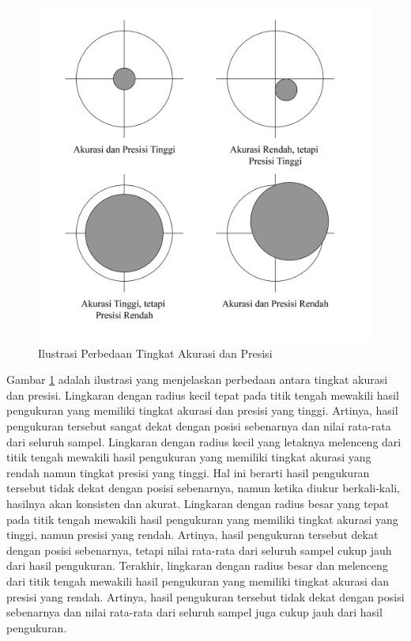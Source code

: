 \begin{figure}[H]
	\centering
	\includegraphics[width=12cm]{contents/chapter-2/acc.png}
	\caption{Ilustrasi Perbedaan Tingkat Akurasi dan Presisi}
	\label{Fig: acc-and-prec-diff}
\end{figure}

\newpage
Gambar \ref{Fig: acc-and-prec-diff} adalah ilustrasi yang menjelaskan perbedaan antara tingkat akurasi dan presisi. Lingkaran dengan radius kecil tepat pada titik tengah mewakili hasil pengukuran yang memiliki tingkat akurasi dan presisi yang tinggi. Artinya, hasil pengukuran tersebut sangat dekat dengan posisi sebenarnya dan nilai rata-rata dari seluruh sampel. Lingkaran dengan radius kecil yang letaknya melenceng dari titik tengah mewakili hasil pengukuran yang memiliki tingkat akurasi yang rendah namun tingkat presisi yang tinggi. Hal ini berarti hasil pengukuran tersebut tidak dekat dengan posisi sebenarnya, namun ketika diukur berkali-kali, hasilnya akan konsisten dan akurat. Lingkaran dengan radius besar yang tepat pada titik tengah mewakili hasil pengukuran yang memiliki tingkat akurasi yang tinggi, namun presisi yang rendah. Artinya, hasil pengukuran tersebut dekat dengan posisi sebenarnya, tetapi nilai rata-rata dari seluruh sampel cukup jauh dari hasil pengukuran. Terakhir, lingkaran dengan radius besar dan melenceng dari titik tengah mewakili hasil pengukuran yang memiliki tingkat akurasi dan presisi yang rendah. Artinya, hasil pengukuran tersebut tidak dekat dengan posisi sebenarnya dan nilai rata-rata dari seluruh sampel juga cukup jauh dari hasil pengukuran.

